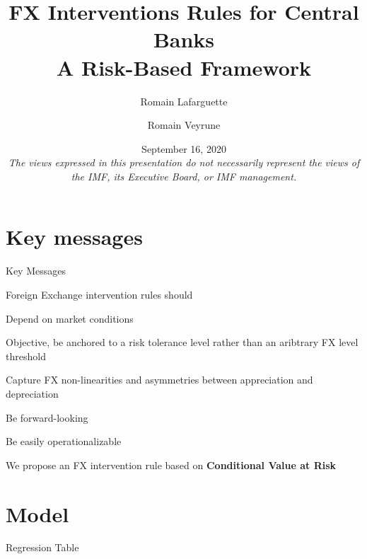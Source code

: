 \documentclass{beamer}
\title[]{FX Interventions Rules for Central Banks\\
A Risk-Based Framework}
\author[]{Romain Lafarguette \and Romain Veyrune}
\institute[]{MCM Central Bank Operations Division}
\date[]{\scriptsize September 16, 2020 \\ \vspace{0.5cm} \scriptsize{\textit{The views
      expressed in this presentation do not necessarily represent the views of
      the IMF, its Executive Board, or IMF management.}} \vspace{-0.3cm}}
\newenvironment{largeitemize}{\itemize\addtolength{\itemsep}{10pt}}{\enditemize}
\begin{document}
\begingroup
\renewcommand{\insertframenumber}{}
\begin{frame}
  \addtocounter{framenumber}{-1}
\maketitle
\end{frame}
\endgroup


\section{Key messages}
\begin{frame}{Key Messages}

  Foreign Exchange intervention rules should\\
  \medskip
  
  \begin{largeitemize}
  \item Depend on market conditions
  \item Objective, be anchored to a risk tolerance level
    rather than an aribtrary FX level threshold
  \item Capture FX non-linearities and asymmetries between appreciation and
    depreciation
  \item Be forward-looking
  \item Be easily operationalizable\\
  \end{largeitemize}

\medskip  
We propose an FX intervention rule based on \textbf{Conditional Value at Risk}
  
\end{frame}


\section{Model}
\begin{frame}{Regression Table}
\setlength\tabcolsep{2pt}  %
\tiny  %

\normalsize
\end{frame}
\end{document}
